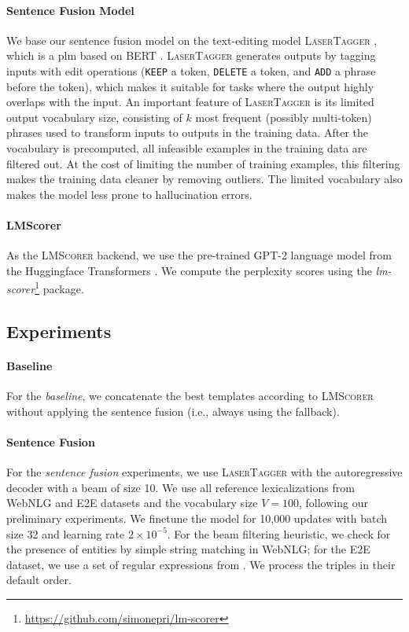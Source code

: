 \paragraph{Sentence Fusion Model} We base our sentence fusion model on the text-editing model \textsc{LaserTagger} \cite{malmi2019lasertagger}, which is a \ac{plm} based on BERT \cite{devlinBERTPretrainingDeep2019}. \textsc{LaserTagger} generates outputs by tagging inputs with edit operations (\texttt{KEEP} a token, \texttt{DELETE} a token, and \texttt{ADD} a phrase before the token), which makes it suitable for tasks where the output highly overlaps with the input. An important feature of \textsc{LaserTagger} is its limited output vocabulary size, consisting of $k$ most frequent (possibly multi-token) phrases used to transform inputs to outputs in the training data. After the vocabulary is precomputed, all infeasible examples in the training data are filtered out. At the cost of limiting the number of training examples, this filtering makes the training data cleaner by removing outliers. The limited vocabulary also makes the model less prone to hallucination errors.

\paragraph{LMScorer} As the \textsc{LMScorer} backend, we use the pre-trained GPT-2 language model \citep{radford2019language} from the Huggingface Transformers \citep{wolf2019HuggingFacesTS}. We compute the perplexity scores using the \textit{lm-scorer}\footnote{\url{https://github.com/simonepri/lm-scorer}} package.








\subsection{Experiments}
\label{sec:iterative:experiments}
\paragraph{Baseline} For the \emph{baseline}, we concatenate the best templates according to \textsc{LMScorer} without applying the sentence fusion (i.e., always using the fallback).

\paragraph{Sentence Fusion} For the \emph{sentence fusion} experiments, we use \textsc{LaserTagger} with the autoregressive decoder with a beam of size 10. We use all reference lexicalizations from WebNLG and E2E datasets and the vocabulary size $V=100$, following our preliminary experiments. We finetune the model for 10,000 updates with batch size 32 and learning rate $2 \times 10^{-5}$.
For the beam filtering heuristic, we check for the presence of entities by simple string matching in WebNLG; for the E2E dataset, we use a set of regular expressions from \citet{dusekSemanticNoiseMatters2019}. We process the triples in their default order.

